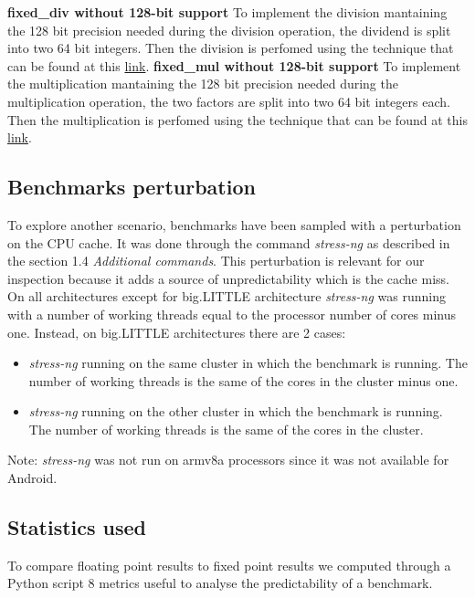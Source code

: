\textbf{fixed\_div without 128-bit support}\newline
To implement the division mantaining the 128 bit precision needed during the division operation,  the dividend is split into two 64 bit integers. Then the division is perfomed using the technique that can be found at this \href{https://codereview.stackexchange.com/questions/67962/mostly-portable-128-by-64-bit-division}{link}.
\clearpage
\textbf{fixed\_mul without 128-bit support}\newline
To implement the multiplication mantaining the 128 bit precision needed during the multiplication operation,  the two factors are split into two 64 bit integers each. Then the multiplication is perfomed using the technique that can be found at this \href{https://stackoverflow.com/questions/31652875/fastest-way-to-multiply-two-64-bit-ints-to-128-bit-then-to-64-bit}{link}.

\subsection{Benchmarks perturbation}
To explore another scenario, benchmarks have been sampled with a perturbation on the CPU cache. It was done through the command \textit{stress-ng} as described in the section 1.4 \textit{Additional commands}.\newline
This perturbation is relevant for our inspection because it adds a source of unpredictability which is the cache miss.\newline
On all architectures except for big.LITTLE architecture \textit{stress-ng} was running with a number of working threads equal to the processor number of cores minus one. Instead, on big.LITTLE architectures there are 2 cases:
\begin{itemize}
	\item \textit{stress-ng} running on the same cluster in which the benchmark is running. The number of working threads is the same of the cores in the cluster minus one.
	\item  \textit{stress-ng} running on the other cluster in which the benchmark is running. The number of working threads is the same of the cores in the cluster.
\end{itemize}
Note: \textit{stress-ng} was not run on armv8a processors since it was not available for Android.
\subsection{Statistics used}
To compare floating point results to fixed point results we computed through a Python script 8 metrics useful to analyse the predictability of a benchmark.

